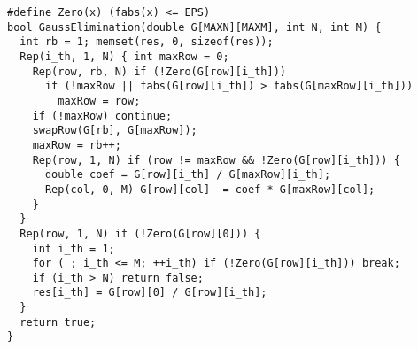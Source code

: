 \begin{lstlisting}
#define Zero(x) (fabs(x) <= EPS)
bool GaussElimination(double G[MAXN][MAXM], int N, int M) {
  int rb = 1; memset(res, 0, sizeof(res));
  Rep(i_th, 1, N) { int maxRow = 0;
    Rep(row, rb, N) if (!Zero(G[row][i_th]))
      if (!maxRow || fabs(G[row][i_th]) > fabs(G[maxRow][i_th]))
        maxRow = row;
    if (!maxRow) continue;
    swapRow(G[rb], G[maxRow]);
    maxRow = rb++;
    Rep(row, 1, N) if (row != maxRow && !Zero(G[row][i_th])) {
      double coef = G[row][i_th] / G[maxRow][i_th];
      Rep(col, 0, M) G[row][col] -= coef * G[maxRow][col];
    }
  }
  Rep(row, 1, N) if (!Zero(G[row][0])) {
    int i_th = 1;
    for ( ; i_th <= M; ++i_th) if (!Zero(G[row][i_th])) break;
    if (i_th > N) return false;
    res[i_th] = G[row][0] / G[row][i_th];
  }
  return true;
}
\end{lstlisting}